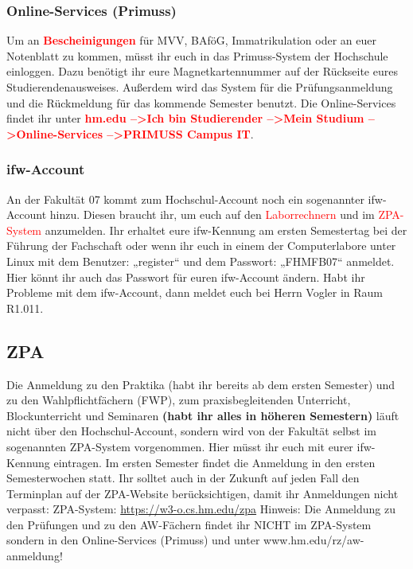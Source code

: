 \subsubsection{Online-Services (Primuss)}
Um an \textcolor{red}{\textbf{Bescheinigungen}} für MVV, BAföG, Immatrikulation oder an euer Notenblatt zu kommen, müsst ihr euch in das Primuss-System der Hochschule einloggen. Dazu benötigt ihr eure Magnetkartennummer auf der Rückseite eures Studierendenausweises. Außerdem wird das System für die Prüfungsanmeldung und die Rückmeldung für das kommende Semester benutzt.\doublebreak
Die Online-Services findet ihr unter \textcolor{red}{\textbf{hm.edu --\textgreater Ich bin Studierender --\textgreater Mein Studium --\textgreater Online-Services --\textgreater PRIMUSS Campus IT}}.

\subsubsection{ifw-Account}

An der Fakultät 07 kommt zum Hochschul-Account noch ein sogenannter ifw-Account hinzu. Diesen braucht ihr, um euch auf den \textcolor{red}{Laborrechnern} und im \textcolor{red}{ZPA-System} anzumelden.\doublebreak
Ihr erhaltet eure ifw-Kennung am ersten Semestertag bei der Führung der Fachschaft oder wenn ihr euch in einem der Computerlabore unter Linux mit dem Benutzer: „register“ und dem Passwort: „FHMFB07“ anmeldet. Hier könnt ihr auch das Passwort für euren ifw-Account ändern. \doublebreak
Habt ihr Probleme mit dem ifw-Account, dann meldet euch bei Herrn Vogler in Raum R1.011.

\subsection{ZPA}

Die Anmeldung zu den Praktika (habt ihr bereits ab dem ersten Semester) und zu den Wahlpflichtfächern (FWP), zum praxisbegleitenden Unterricht, Blockunterricht und Seminaren \textbf{(habt ihr alles in höheren Semestern)} läuft nicht über den Hochschul-Account, sondern wird von der Fakultät selbst im sogenannten ZPA-System vorgenommen. Hier müsst ihr euch mit eurer ifw-Kennung eintragen. Im ersten Semester findet die Anmeldung in den ersten Semesterwochen statt. Ihr solltet auch in der Zukunft auf jeden Fall den Terminplan auf der ZPA-Website berücksichtigen, damit ihr Anmeldungen nicht verpasst:\doublebreak
ZPA-System: \url{https://w3-o.cs.hm.edu/zpa}\doublebreak
Hinweis: Die Anmeldung zu den Prüfungen und zu den AW-Fächern findet ihr NICHT im ZPA-System sondern in den Online-Services (Primuss) und unter www.hm.edu/rz/aw-anmeldung!

